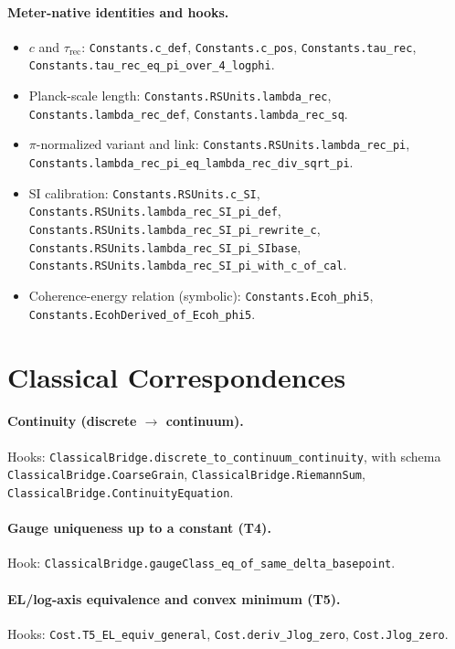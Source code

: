 \documentclass[11pt]{article}
\newcommand{\LeanHook}[1]{\texttt{#1}}
\begin{document}
\paragraph{Meter-native identities and hooks.}
\begin{itemize}[leftmargin=1.25em]
  \item $c$ and $\tau_{\mathrm{rec}}$: \LeanHook{Constants.c\_def}, \LeanHook{Constants.c\_pos}, \LeanHook{Constants.tau\_rec}, \LeanHook{Constants.tau\_rec\_eq\_pi\_over\_4\_logphi}.
  \item Planck-scale length: \LeanHook{Constants.RSUnits.lambda\_rec}, \LeanHook{Constants.lambda\_rec\_def}, \LeanHook{Constants.lambda\_rec\_sq}.
  \item $\pi$-normalized variant and link: \LeanHook{Constants.RSUnits.lambda\_rec\_pi}, \LeanHook{Constants.lambda\_rec\_pi\_eq\_lambda\_rec\_div\_sqrt\_pi}.
  \item SI calibration: \LeanHook{Constants.RSUnits.c\_SI}, \LeanHook{Constants.RSUnits.lambda\_rec\_SI\_pi\_def}, \LeanHook{Constants.RSUnits.lambda\_rec\_SI\_pi\_rewrite\_c}, \LeanHook{Constants.RSUnits.lambda\_rec\_SI\_pi\_SIbase}, \LeanHook{Constants.RSUnits.lambda\_rec\_SI\_pi\_with\_c\_of\_cal}.
  \item Coherence-energy relation (symbolic): \LeanHook{Constants.Ecoh\_phi5}, \LeanHook{Constants.EcohDerived\_of\_Ecoh\_phi5}.
\end{itemize}

\section{Classical Correspondences}
\paragraph{Continuity (discrete $\to$ continuum).} Hooks: \LeanHook{ClassicalBridge.discrete\_to\_continuum\_continuity}, with schema \LeanHook{ClassicalBridge.CoarseGrain}, \LeanHook{ClassicalBridge.RiemannSum}, \LeanHook{ClassicalBridge.ContinuityEquation}.

\paragraph{Gauge uniqueness up to a constant (T4).} Hook: \LeanHook{ClassicalBridge.gaugeClass\_eq\_of\_same\_delta\_basepoint}.

\paragraph{EL/log-axis equivalence and convex minimum (T5).} Hooks: \LeanHook{Cost.T5\_EL\_equiv\_general}, \LeanHook{Cost.deriv\_Jlog\_zero}, \LeanHook{Cost.Jlog\_zero}.
\end{document}
